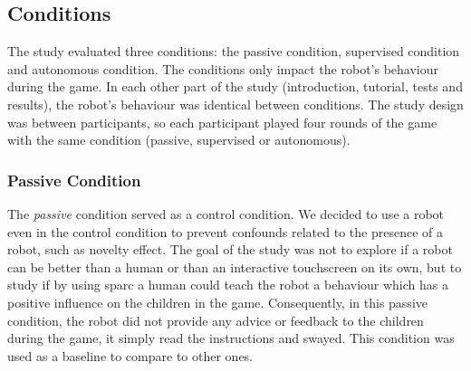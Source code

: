 

\subsection{Conditions}
The study evaluated three conditions: the passive condition, supervised condition and autonomous condition. The conditions only impact the robot's behaviour during the game. In each other part of the study (introduction, tutorial, tests and results), the robot's behaviour was identical between conditions.
The study design was between participants, so each participant played four rounds of the game with the same condition (passive, supervised or autonomous).  %

\subsubsection{Passive Condition}

The \textit{passive} condition served as a control condition. We decided to use a robot even in the control condition to prevent confounds related to the presence of a robot, such as novelty effect. The goal of the study was not to explore if a robot can be better than a human or than an interactive touchscreen on its own, but to study if by using \gls{sparc} a human could teach the robot a behaviour which has a positive influence on the children in the game. Consequently, in this passive condition, the robot did not provide any advice or feedback to the children during the game, it simply read the instructions and swayed. This condition was used as a baseline to compare to other ones.


